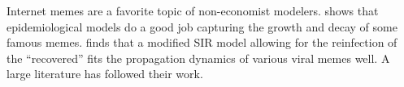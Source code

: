 Internet memes are a favorite topic of non-economist modelers.  shows that epidemiological models do a good job capturing the growth and decay of some famous memes.\ifInBook{}{}%
\cite{wang2011epidemiological} finds that a modified SIR model allowing for the reinfection of the ``recovered'' fits  the propagation dynamics of various viral memes well.   A large literature has followed their work. %




